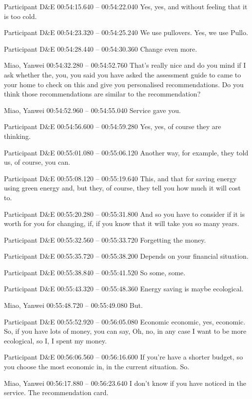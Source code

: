 {Participant D\&E 00:54:15.640 -- 00:54:22.040
Yes, yes, and without feeling that it is too cold.

Participant D\&E 00:54:23.320 -- 00:54:25.240
We use pullovers. Yes, we use Pullo.

Participant D\&E 00:54:28.440 -- 00:54:30.360
Change even more.

Miao, Yanwei 00:54:32.280 -- 00:54:52.760
That's really nice and do you mind if I ask whether the, you, you said you have asked the assessment guide to came to your home to check on this and give you personalised recommendations. Do you think those recommendations are similar to the recommendation?

Miao, Yanwei 00:54:52.960 -- 00:54:55.040
Service gave you.

Participant D\&E 00:54:56.600 -- 00:54:59.280
Yes, yes, of course they are thinking.

Participant D\&E 00:55:01.080 -- 00:55:06.120
Another way, for example, they told us, of course, you can.

Participant D\&E 00:55:08.120 -- 00:55:19.640
This, and that for saving energy using green energy and, but they, of course, they tell you how much it will cost to.

Participant D\&E 00:55:20.280 -- 00:55:31.800
And so you have to consider if it is worth for you for changing, if, if you know that it will take you so many years.

Participant D\&E 00:55:32.560 -- 00:55:33.720
Forgetting the money.

Participant D\&E 00:55:35.720 -- 00:55:38.200
Depends on your financial situation.

Participant D\&E 00:55:38.840 -- 00:55:41.520
So some, some.

Participant D\&E 00:55:43.320 -- 00:55:48.360
Energy saving is maybe ecological.

Miao, Yanwei 00:55:48.720 -- 00:55:49.080
But.

Participant D\&E 00:55:52.920 -- 00:56:05.080
Economic economic, yes, economic. So, if you have lots of money, you can say, Oh, no, in any case I want to be more ecological, so I, I spent my money.

Participant D\&E 00:56:06.560 -- 00:56:16.600
If you're have a shorter budget, so you choose the most economic in, in the current situation. So.

Miao, Yanwei 00:56:17.880 -- 00:56:23.640
I don't know if you have noticed in the service. The recommendation card.

}
